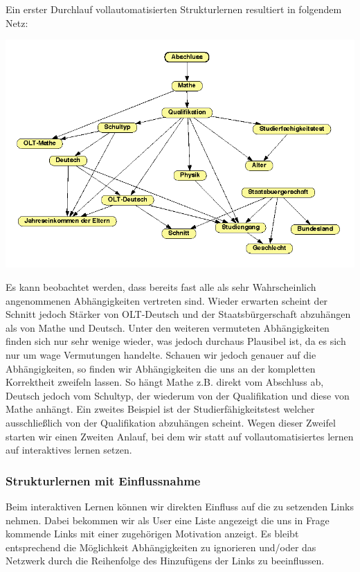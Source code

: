 Ein erster Durchlauf vollautomatisierten Strukturlernen resultiert in folgendem Netz:
\begin{center}
	\includegraphics[width=1.00\textwidth]{content/pictures/autoNetwork.png}
\end{center}

Es kann beobachtet werden, dass bereits fast alle als sehr Wahrscheinlich angenommenen Abhängigkeiten vertreten sind. Wieder erwarten scheint der Schnitt jedoch Stärker von OLT-Deutsch und der Staatsbürgerschaft abzuhängen als von Mathe und Deutsch. Unter den weiteren vermuteten Abhängigkeiten finden sich nur sehr wenige wieder, was jedoch durchaus Plausibel ist, da es sich nur um wage Vermutungen handelte. Schauen wir jedoch genauer auf die Abhängigkeiten, so finden wir Abhängigkeiten die uns an der kompletten Korrektheit zweifeln lassen. So hängt Mathe z.B. direkt vom Abschluss ab, Deutsch jedoch vom Schultyp, der wiederum von der Qualifikation und diese von Mathe anhängt. Ein zweites Beispiel ist der Studierfähigkeitstest welcher ausschließlich von der Qualifikation abzuhängen scheint.   
Wegen dieser Zweifel starten wir einen Zweiten Anlauf, bei dem wir statt auf vollautomatisiertes lernen auf interaktives lernen setzen. 
 
\subsubsection*{Strukturlernen mit Einflussnahme}
Beim interaktiven Lernen können wir direkten Einfluss auf die zu setzenden Links nehmen. Dabei bekommen wir als User eine Liste angezeigt die uns in Frage kommende Links mit einer zugehörigen Motivation anzeigt. Es bleibt entsprechend die Möglichkeit Abhängigkeiten zu ignorieren und/oder das Netzwerk durch die Reihenfolge des Hinzufügens der Links zu beeinflussen. 

